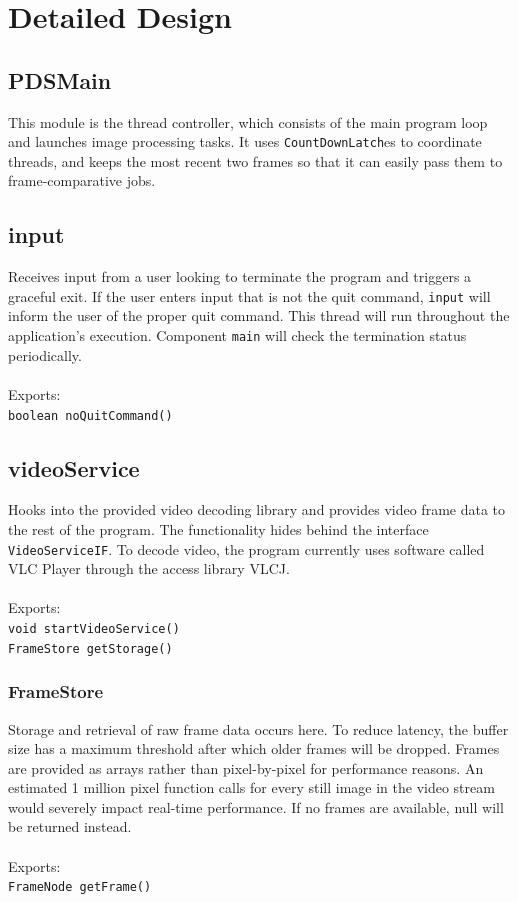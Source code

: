 \documentclass[11pt]{report}
\begin{document}
\section{Detailed Design}

\subsection{PDSMain}

This module is the thread controller, which consists of the main program loop and launches image processing tasks.  It uses \texttt{CountDownLatch}es to coordinate threads, and keeps the most recent two frames so that it can easily pass them to frame-comparative jobs.

\subsection{input}

Receives input from a user looking to terminate the program and triggers a graceful exit.  If the user enters input that is not the quit command, \texttt{input} will inform the user of the proper quit command.  This thread will run throughout the application's execution.  Component \texttt{main} will check the termination status periodically.\\
\\
Exports: \\
\texttt{boolean noQuitCommand()}

\subsection{videoService}

Hooks into the provided video decoding library and provides video frame data to the rest of the program.  The functionality hides behind the interface \texttt{VideoServiceIF}.  To decode video, the program currently uses software called VLC Player through the access library VLCJ.\\
\\
Exports: \\
\texttt{void startVideoService()}\\
\texttt{FrameStore getStorage()}

\subsubsection{FrameStore}

Storage and retrieval of raw frame data occurs here. To reduce latency, the buffer size has a maximum threshold after which older frames will be dropped.  Frames are provided as arrays rather than pixel-by-pixel for performance reasons.  An estimated 1 million pixel function calls for every still image in the video stream would severely impact real-time performance.  If no frames are available, null will be returned instead.\\
\\
Exports:\\
\texttt{FrameNode getFrame()}
\end{document}
